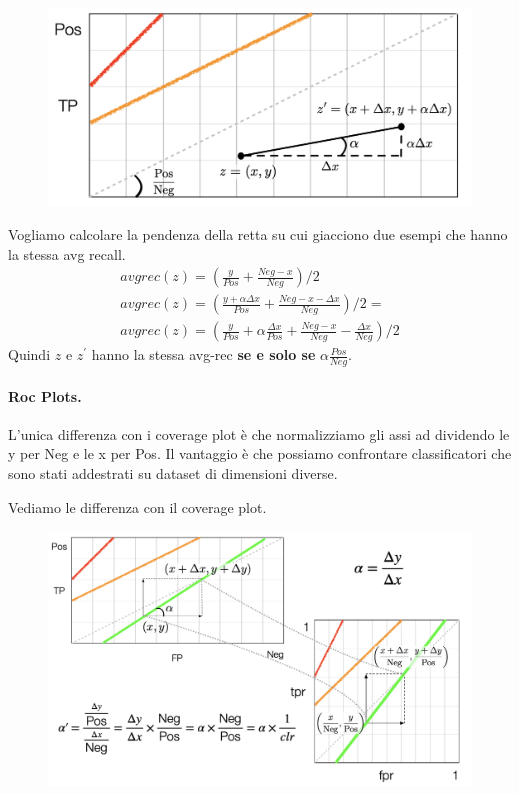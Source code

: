 \begin{figure}[!h]
    \centering
    \includegraphics[scale=0.6]{images/avgRec.png}
    \label{fig:enter-label}
\end{figure}

Vogliamo calcolare la pendenza della retta su cui giacciono due esempi che hanno la stessa avg recall.
\begin{equation}
\begin{split}
    avgrec(z)=\left(\frac{y}{Pos}+\frac{Neg-x}{Neg} \right)/2 \\
    avgrec(z)=\left(\frac{y+\alpha \Delta x}{Pos}+\frac{Neg-x-\Delta x}{Neg} \right)/2 =\\
    avgrec(z)=\left(\frac{y}{Pos}+\alpha\frac{\Delta x}{Pos}+\frac{Neg-x}{Neg}-\frac{\Delta x}{Neg} \right)/2
\end{split}
\end{equation}
Quindi $z$ e $z^{'}$ hanno la stessa avg-rec \textbf{se e solo se} $\alpha\frac{Pos}{Neg}$.

\newpage

\paragraph{Roc Plots.} L'unica differenza con i coverage plot è che normalizziamo gli assi ad dividendo le y per Neg e le x per Pos. Il vantaggio è che possiamo confrontare classificatori che sono stati addestrati su dataset di dimensioni diverse.

Vediamo le differenza con il coverage plot.
\begin{figure}[!h]
    \centering
    \includegraphics[scale=0.5]{images/rocPlot.png}
    \label{fig:enter-label}
\end{figure}

